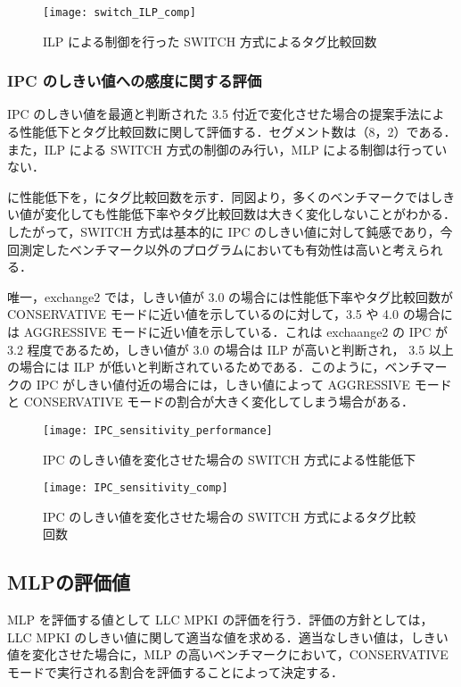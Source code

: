 \begin{figure}[htb]
  \centering
  \texttt{[image: switch\_ILP\_comp]}
  \caption{ILP による制御を行った SWITCH 方式によるタグ比較回数}
  \label{fig:switch_ILP_comp}
\end{figure}

\subsubsection{IPC のしきい値への感度に関する評価}
IPC のしきい値を最適と判断された 3.5 付近で変化させた場合の提案手法による性能低下とタグ比較回数に関して評価する．セグメント数は（8，2）である．また，ILP による SWITCH 方式の制御のみ行い，MLP による制御は行っていない．

に性能低下を，にタグ比較回数を示す．同図より，多くのベンチマークではしきい値が変化しても性能低下率やタグ比較回数は大きく変化しないことがわかる．したがって，SWITCH 方式は基本的に IPC のしきい値に対して鈍感であり，今回測定したベンチマーク以外のプログラムにおいても有効性は高いと考えられる．

唯一，exchange2 では，しきい値が 3.0 の場合には性能低下率やタグ比較回数が CONSERVATIVE モードに近い値を示しているのに対して，3.5 や 4.0 の場合には AGGRESSIVE モードに近い値を示している．これは exchaange2 の IPC が 3.2 程度であるため，しきい値が 3.0 の場合は ILP が高いと判断され， 3.5 以上の場合には ILP が低いと判断されているためである．このように，ベンチマークの IPC がしきい値付近の場合には，しきい値によって AGGRESSIVE モードと CONSERVATIVE モードの割合が大きく変化してしまう場合がある．

\begin{figure}[htb]
  \centering
  \texttt{[image: IPC\_sensitivity\_performance]}
  \caption{IPC のしきい値を変化させた場合の SWITCH 方式による性能低下}
  \label{fig:IPC_sensitivity_performance}
\end{figure}

\begin{figure}[htb]
  \centering
  \texttt{[image: IPC\_sensitivity\_comp]}
  \caption{IPC のしきい値を変化させた場合の SWITCH 方式によるタグ比較回数}
  \label{fig:IPC_sensitivity_comp}
\end{figure}

\clearpage

\subsection{MLPの評価値}
MLP を評価する値として LLC MPKI の評価を行う．評価の方針としては，LLC MPKI のしきい値に関して適当な値を求める．適当なしきい値は，しきい値を変化させた場合に，MLP の高いベンチマークにおいて，CONSERVATIVE モードで実行される割合を評価することによって決定する．

